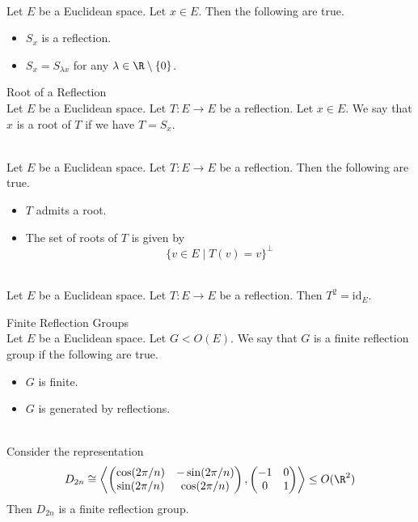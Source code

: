 \documentclass[a4paper]{article}
\begin{document}
\begin{lmm}{}{}\\
Let $E$ be a Euclidean space. Let $x\in E$. Then the following are true. 
\begin{itemize}
\item $S_x$ is a reflection. 
\item $S_x=S_{\lambda x}$ for any $\lambda\in\R\setminus\{0\}$. 
\end{itemize}
\end{lmm}

\begin{defn}{Root of a Reflection}{}\\
Let $E$ be a Euclidean space. Let $T:E\to E$ be a reflection. Let $x\in E$. We say that $x$ is a root of $T$ if we have $T=S_x$. 
\end{defn}

\begin{prp}{}{}\\
Let $E$ be a Euclidean space. Let $T:E\to E$ be a reflection. Then the following are true. 
\begin{itemize}
\item $T$ admits a root. 
\item The set of roots of $T$ is given by $$\{v\in E\;|\;T(v)=v\}^\perp$$
\end{itemize}
\end{prp}

\begin{lmm}{}{}\\
Let $E$ be a Euclidean space. Let $T:E\to E$ be a reflection. Then $T^2=\text{id}_E$. 
\end{lmm}

\begin{defn}{Finite Reflection Groups}{}\\
Let $E$ be a Euclidean space. Let $G<O(E)$. We say that $G$ is a finite reflection group if the following are true. 
\begin{itemize}
\item $G$ is finite. 
\item $G$ is generated by reflections. 
\end{itemize}
\end{defn}

\begin{eg}{}{}\\
Consider the representation $$D_{2n}\cong\left\langle\begin{pmatrix}
\cos(2\pi/n) & -\sin(2\pi/n)\\
\sin(2\pi/n) & \cos(2\pi/n)
\end{pmatrix}, \begin{pmatrix}
-1 & 0\\
0 & 1
\end{pmatrix}\right\rangle\leq O(\R^2)$$ Then $D_{2n}$ is a finite reflection group. 
\end{eg}
\end{document}
